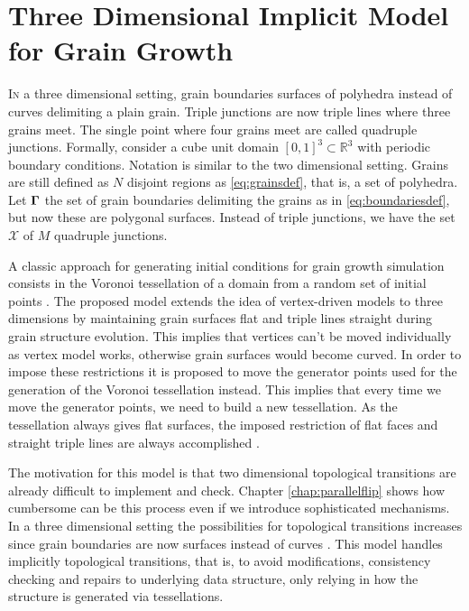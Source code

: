 \chapter{Three Dimensional Implicit Model for Grain Growth}

\lettrine{I}{n} a three dimensional setting, grain boundaries surfaces of polyhedra instead of curves delimiting a plain grain. Triple junctions are now triple lines where three grains meet. The single point where four grains meet are called quadruple junctions. Formally, consider a cube unit domain $[0,1]^3 \subset \mathbb{R}^3$ with periodic boundary conditions. Notation is similar to the two dimensional setting. Grains are still defined as $N$ disjoint regions as \eqref{eq:grainsdef}, that is, a set of polyhedra. Let $\bm{\Gamma}$ the set of grain boundaries delimiting the grains as in \eqref{eq:boundariesdef}, but now these are polygonal surfaces. Instead of triple junctions, we have the set $\mathcal{X}$ of $M$ quadruple junctions.

A classic approach for generating initial conditions for grain growth simulation consists in the Voronoi tessellation of a domain from a random set of initial points \cite{Barmak2013,BarralesMora2008,Kinderlehrer2006,Lazar2011,Syha2010,torres2015}. The proposed model extends the idea of vertex-driven models to three dimensions by maintaining grain surfaces flat and triple lines straight during grain structure evolution. This implies that vertices can't be moved individually as vertex model works, otherwise grain surfaces would become curved. In order to impose these restrictions it is proposed to move the generator points used for the generation of the Voronoi tessellation instead. This implies that every time we move the generator points, we need to build a new tessellation. As the tessellation always gives flat surfaces, the imposed restriction of flat faces and straight triple lines are always accomplished \cite{sazo2017}.

The motivation for this model is that two dimensional topological transitions are already difficult to implement and check. Chapter \ref{chap:parallelflip} shows how cumbersome can be this process even if we introduce sophisticated mechanisms. In a three dimensional setting the possibilities for topological transitions increases since grain boundaries are now surfaces instead of curves \cite{BarralesMora2008}. This model handles implicitly topological transitions, that is, to avoid modifications, consistency checking and repairs to underlying data structure, only relying in how the structure is generated via tessellations.


